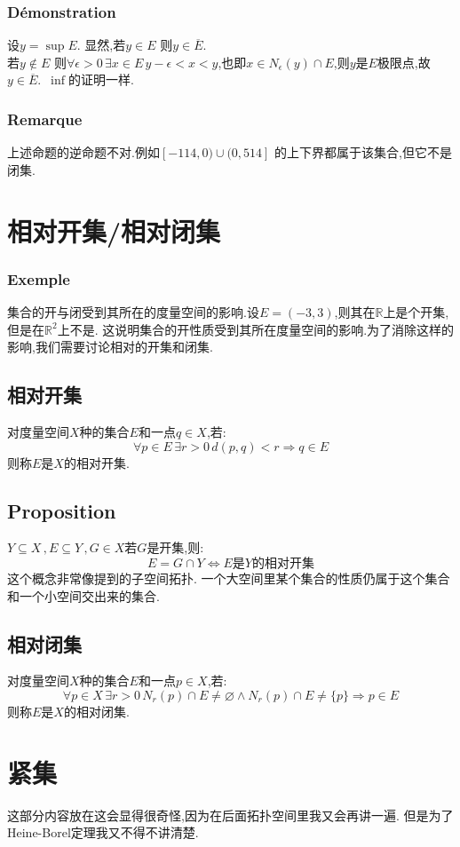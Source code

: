 \documentclass[12pt, a4paper, oneside]{ctexbook}
\begin{document}
  \subsubsection{Démonstration}
  \noindent
  设$y=\sup E$.
  显然,若$y\in E$ 则$y\in \overline{E}$.\\
  若$y\notin E$ 则$\forall\epsilon>0\,\exists x\in E\, y-\epsilon<x<y $,也即$x\in N_\epsilon(y)\cap E$,则$y$是$E$极限点,故$y\in \overline{E}$.\
  $\inf$的证明一样.
  \subsubsection{Remarque}
  上述命题的逆命题不对.例如$[-114,0)\cup(0,514]$ 的上下界都属于该集合,但它不是闭集.
\section{相对开集/相对闭集}
  \subsubsection{Exemple}
  集合的开与闭受到其所在的度量空间的影响.设$E=(-3,3)$,则其在$\mathbb{R}$上是个开集,但是在$\mathbb{R}^2$上不是.
  这说明集合的开性质受到其所在度量空间的影响.为了消除这样的影响,我们需要讨论相对的开集和闭集.
  \subsection{相对开集}
  对度量空间$X$种的集合$E$和一点$q\in X$,若:
  $$
  \forall p\in E\,\exists r>0\,d(p,q)<r \Rightarrow q\in E
  $$
  则称$E$是$X$的相对开集.
  \subsection{Proposition}
  $Y\subseteq X\,,E\subseteq Y\,,G\in X$若$G$是开集,则:
  $$
  E=G\cap Y\Leftrightarrow E\text{是}Y\text{的相对开集}
  $$
  这个概念非常像提到的子空间拓扑.
  一个大空间里某个集合的性质仍属于这个集合和一个小空间交出来的集合.
  \subsection{相对闭集}
  对度量空间$X$种的集合$E$和一点$p\in X$,若:
  $$
  \forall p\in X\, \exists r>0\, N_r(p)\cap E\neq \varnothing\land N_r(p)\cap E\neq\{p\}\Rightarrow p\in E
  $$
  则称$E$是$X$的相对闭集.
  \section{紧集}%
    这部分内容放在这会显得很奇怪,因为在后面拓扑空间里我又会再讲一遍.
    但是为了Heine-Borel定理我又不得不讲清楚.
\end{document}
